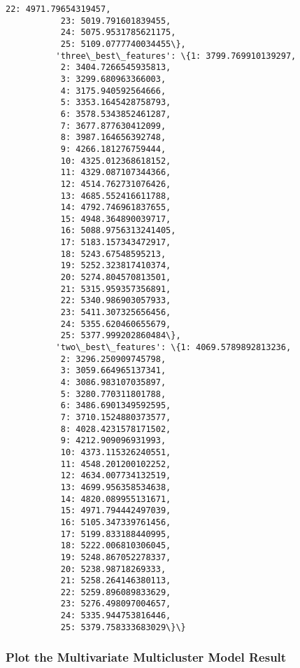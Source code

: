 \documentclass[11pt]{article}
\begin{document}
\begin{Verbatim}[commandchars=\\\{\}]
           22: 4971.79654319457,
           23: 5019.791601839455,
           24: 5075.9531785621175,
           25: 5109.0777740034455\},
          'three\_best\_features': \{1: 3799.769910139297,
           2: 3404.7266545935813,
           3: 3299.680963366003,
           4: 3175.940592564666,
           5: 3353.1645428758793,
           6: 3578.5343852461287,
           7: 3677.877630412099,
           8: 3987.164656392748,
           9: 4266.181276759444,
           10: 4325.012368618152,
           11: 4329.087107344366,
           12: 4514.762731076426,
           13: 4685.552416611788,
           14: 4792.746961837655,
           15: 4948.364890039717,
           16: 5088.9756313241405,
           17: 5183.157343472917,
           18: 5243.67548595213,
           19: 5252.323817410374,
           20: 5274.804570813501,
           21: 5315.959357356891,
           22: 5340.986903057933,
           23: 5411.307325656456,
           24: 5355.620460655679,
           25: 5377.999202860484\},
          'two\_best\_features': \{1: 4069.5789892813236,
           2: 3296.250909745798,
           3: 3059.664965137341,
           4: 3086.983107035897,
           5: 3280.770311801788,
           6: 3486.6901349592595,
           7: 3710.1524880373577,
           8: 4028.4231578171502,
           9: 4212.909096931993,
           10: 4373.115326240551,
           11: 4548.201200102252,
           12: 4634.007734132519,
           13: 4699.956358534638,
           14: 4820.089955131671,
           15: 4971.794442497039,
           16: 5105.347339761456,
           17: 5199.833188440995,
           18: 5222.006810306045,
           19: 5248.867052278337,
           20: 5238.98718269333,
           21: 5258.264146380113,
           22: 5259.896089833629,
           23: 5276.498097004657,
           24: 5335.944753816446,
           25: 5379.758333683029\}\}
\end{Verbatim}
            
    \subsubsection{Plot the Multivariate Multicluster Model
Result}\label{plot-the-multivariate-multicluster-model-result}
\end{document}
